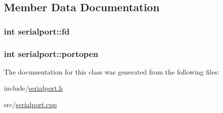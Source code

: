 \subsection{Member Data Documentation}
\hypertarget{classserialport_ac0f432659cd8e2a2a05a7d8583d73968}{
\subsubsection[{fd}]{\setlength{\rightskip}{0pt plus 5cm}int serialport\-::fd\hspace{0.3cm}{\ttfamily [private]}}}\label{classserialport_ac0f432659cd8e2a2a05a7d8583d73968}
\hypertarget{classserialport_ac2fa330c6a6d254fcda6e327eac6a7e7}{
\subsubsection[{portopen}]{\setlength{\rightskip}{0pt plus 5cm}int serialport\-::portopen\hspace{0.3cm}{\ttfamily [private]}}}\label{classserialport_ac2fa330c6a6d254fcda6e327eac6a7e7}


The documentation for this class was generated from the following files\-:\begin{DoxyCompactItemize}
\item 
include/\hyperlink{serialport_8h}{serialport.\-h}\item 
src/\hyperlink{serialport_8cpp}{serialport.\-cpp}\end{DoxyCompactItemize}
